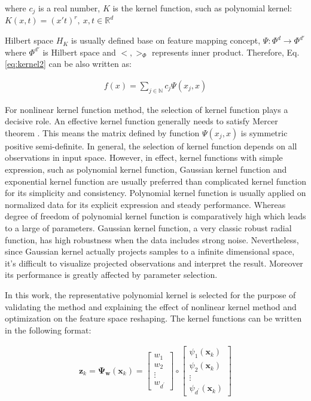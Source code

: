 where $c_j$ is a real number, $K$ is the kernel function, such as polynomial kernel: $K(x,t)=(x't)^r,~x,t\in \mathbb{R}^d$

Hilbert space $H_K$ is usually defined base on feature mapping concept, $\Psi:\Phi^d\to \Phi^{d'}$ where $\Phi^{d'}$ is Hilbert space and $<,>_{\Phi}$  represents inner product. Therefore, Eq.\ref{eq:kernel2} can be also written as:

\begin{align}
    f(x) = \sum_{j\in \mathbb{N}}c_j \Psi(x_j,x)
\end{align}

For nonlinear kernel function method, the selection of kernel function plays a decisive role. An effective kernel function generally needs to satisfy Mercer theorem \cite{cristianini2000introduction}. This means the matrix defined by function $\Psi(x_j,x)$ is symmetric positive semi-definite. In general, the selection of kernel function depends on all observations in input space. However, in effect, kernel functions with simple expression, such as polynomial kernel function, Gaussian kernel function and exponential kernel function are usually preferred than complicated kernel function for its simplicity and consistency. Polynomial kernel function is usually applied on normalized data for its explicit expression and steady performance. Whereas degree of freedom of polynomial kernel function is comparatively high which leads to a large of parameters. Gaussian kernel function, a very classic robust radial function, has high robustness when the data includes strong noise. Nevertheless, since Gaussian kernel actually projects samples to a infinite dimensional space, it's difficult to visualize projected observations and interpret the result. Moreover its performance is greatly affected by parameter selection.

In this work, the representative polynomial kernel is selected for the purpose of validating the method and explaining the effect of nonlinear kernel method and optimization on the feature space reshaping. The kernel functions can be written in the following format:

\begin{align}
\mathbf{z}_k
=\mathbf{\Psi_{w}} (\mathbf{x}_k) = 
\begin{bmatrix}
w_{1}  \\
w_{2}   \\
\vdots \\
w_{d^\prime} 
\end{bmatrix}
\circ
\begin{bmatrix}
\psi_1(\mathbf{x}_k)\\
\psi_2(\mathbf{x}_k)\\
\vdots\\
\psi_{d^\prime}(\mathbf{x}_k)
\end{bmatrix}
\label{eq:z}
\end{align}

